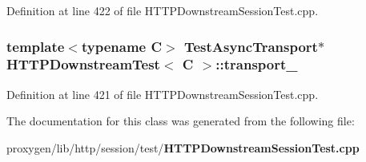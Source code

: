 Definition at line 422 of file H\+T\+T\+P\+Downstream\+Session\+Test.\+cpp.

\subsubsection[{transport\+\_\+}]{\setlength{\rightskip}{0pt plus 5cm}template$<$typename C$>$ {\bf Test\+Async\+Transport}$\ast$ {\bf H\+T\+T\+P\+Downstream\+Test}$<$ C $>$\+::transport\+\_\+\hspace{0.3cm}{\ttfamily [protected]}}\label{classHTTPDownstreamTest_ab44b1edf6354c86649b1354696b36f68}


Definition at line 421 of file H\+T\+T\+P\+Downstream\+Session\+Test.\+cpp.



The documentation for this class was generated from the following file\+:\begin{DoxyCompactItemize}
\item 
proxygen/lib/http/session/test/{\bf H\+T\+T\+P\+Downstream\+Session\+Test.\+cpp}\end{DoxyCompactItemize}
